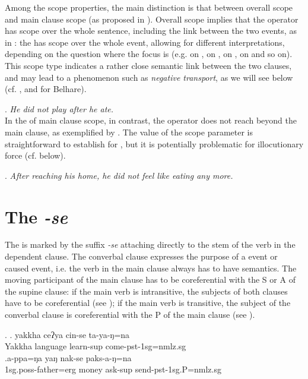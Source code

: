 Among the scope properties, the main distinction is that between overall scope and main clause scope (as proposed in \citet{Bierkandtetal_Scope}). Overall scope implies that the operator has scope over the whole sentence, including the link between the two events, as in \Next: the  has scope over the whole event, allowing for different interpretations, depending on the question where the focus is (e.g. on , on , on , on  and so on). This scope type indicates a rather close semantic link between the two clauses, and may lead to a phenomenon such as \emph{negative transport},  as we will see below (cf. \citealt[Ch. 5]{Horn1989A-natural}, and \citealt{Bickel1993Belhare} for Belhare). 

\ex. \emph{He did not play after he ate.}\\

In the  of main clause scope, in contrast, the operator does not reach beyond the main clause, as exemplified by \Next. The value of the scope parameter is straightforward to establish for , but it is potentially problematic for illocutionary force (cf. below).

\ex. \emph{After reaching his home, he did not feel like eating any more.}

\section{The  \emph{-se}}\label{sup}

The  is marked by the suffix \emph{-se} attaching directly to the stem of the verb in the dependent clause.  The converbal clause expresses the purpose of a  event or caused  event, i.e. the verb in the main clause always has to have  semantics. The moving participant of the main clause has to be coreferential with the S or A of the supine clause: if the main verb is intransitive, the subjects of both clauses have to be coreferential (see \Next[a]); if the main verb is transitive, the subject of the converbal clause is coreferential with the P of the main clause (see \Next[b]). 
		
\ex. \ag.	yakkha ceʔya cin-se ta-ya-ŋ=na\\
			Yakkha language learn{\sc -sup} come-{\sc pst-1sg=nmlz.sg}\\
	\bg.\label{se-appa}a-ppa=ŋa  yaŋ  nak-se  paks-a-ŋ=na\\
		{\sc 1sg.poss-}father{\sc =erg} money ask{\sc -sup}  send-{\sc pst-1sg.P=nmlz.sg}\\
		
